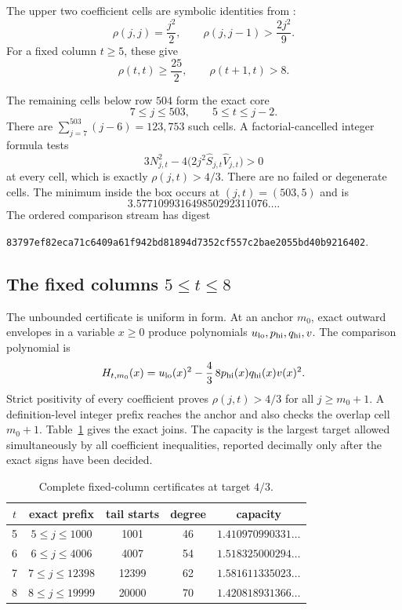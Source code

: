 \documentclass[11pt,a4paper]{article}
\theoremstyle{plain}
\theoremstyle{remark}
\begin{document}
The upper two coefficient cells are symbolic identities from
\cite{squaretail}:
\begin{equation}\label{eq:terminal}
 \rho(j,j)=\frac{j^2}{2},
 \qquad
 \rho(j,j-1)>\frac{2j^2}{9}.
\end{equation}
For a fixed column $t\ge5$, these give
\[
 \rho(t,t)\ge\frac{25}{2},
 \qquad
 \rho(t+1,t)>8.
\]

The remaining cells below row $504$ form the exact core
\begin{equation}\label{eq:corebox}
 7\le j\le503,\qquad 5\le t\le j-2.
\end{equation}
There are
$\sum_{j=7}^{503}(j-6)=123{,}753$ such cells.  A factorial-cancelled integer
formula tests
\[
 3N_{j,t}^2-4\bigl(2j^2\widehat S_{j,t}\widehat V_{j,t}\bigr)>0
\]
at every cell, which is exactly $\rho(j,t)>4/3$.  There are no failed or
degenerate cells.  The minimum inside the box occurs at $(j,t)=(503,5)$ and is
\[
 3.577109931649850292311076\ldots.
\]
The ordered comparison stream has digest
\begin{center}
\texttt{83797ef82eca71c6409a61f942bd81894d7352cf557c2bae2055bd40b9216402}.
\end{center}

\subsection{The fixed columns \texorpdfstring{$5\le t\le8$}{5 <= t <= 8}}

The unbounded certificate is uniform in form.  At an anchor $m_0$, exact
outward envelopes in a variable $x\ge0$ produce polynomials
$u_{\rm lo},p_{\rm hi},q_{\rm hi},v$.  The comparison polynomial is
\begin{equation}\label{eq:tailpoly}
 H_{t,m_0}(x)=u_{\rm lo}(x)^2
 -\frac43\,8p_{\rm hi}(x)q_{\rm hi}(x)v(x)^2.
\end{equation}
Strict positivity of every coefficient proves $\rho(j,t)>4/3$ for all
$j\ge m_0+1$.  A definition-level integer prefix reaches the anchor and also
checks the overlap cell $m_0+1$.  Table~\ref{tab:columns} gives the exact
joins.  The capacity is the largest target allowed simultaneously by all
coefficient inequalities, reported decimally only after the exact signs have
been decided.

\begin{table}[ht]
\centering
\caption{Complete fixed-column certificates at target $4/3$.}
\label{tab:columns}
\begin{tabular}{@{}ccccc@{}}
\toprule
$t$ & exact prefix & tail starts & degree & capacity\\
\midrule
5 & $5\le j\le1000$ & 1001 & 46 & $1.410970990331\ldots$\\
6 & $6\le j\le4006$ & 4007 & 54 & $1.518325000294\ldots$\\
7 & $7\le j\le12398$ & 12399 & 62 & $1.581611335023\ldots$\\
8 & $8\le j\le19999$ & 20000 & 70 & $1.420818931366\ldots$\\
\bottomrule
\end{tabular}
\end{table}
\end{document}
